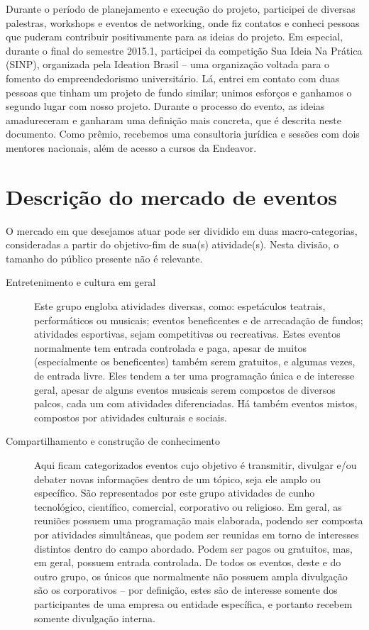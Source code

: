 \documentclass[12pt,a4paper,twoside,hyphens,english,brazil]{abntex2}
\begin{document}
Durante o período de planejamento e execução do projeto, participei de diversas palestras, workshops\cite{workshop-startup} e eventos de networking, onde fiz contatos e conheci pessoas que puderam contribuir positivamente para as ideias do projeto. Em especial, durante o final do semestre 2015.1, participei da competição Sua Ideia Na Prática (SINP), organizada pela Ideation Brasil\cite{sinp-2015.1} -- uma organização voltada para o fomento do empreendedorismo universitário. Lá, entrei em contato com duas pessoas que tinham um projeto de fundo similar; unimos esforços e ganhamos o segundo lugar com nosso projeto. Durante o processo do evento, as ideias amadureceram e ganharam uma definição mais concreta, que é descrita neste documento. Como prêmio, recebemos uma consultoria jurídica e sessões com dois mentores nacionais, além de acesso a cursos da Endeavor.


\section{Descrição do mercado de eventos}
O mercado em que desejamos atuar pode ser dividido em duas macro-categorias, consideradas a partir do objetivo-fim de sua(s) atividade(s). Nesta divisão, o tamanho do público presente não é relevante. %

\begin{description}
	\item[Entretenimento e cultura em geral]
	Este grupo engloba atividades diversas, como: espetáculos teatrais, performáticos ou musicais; eventos beneficentes e de arrecadação de fundos; atividades esportivas, sejam competitivas ou recreativas. Estes eventos normalmente tem entrada controlada e paga, apesar de muitos (especialmente os beneficentes) também serem gratuitos, e algumas vezes, de entrada livre. Eles tendem a ter uma programação única e de interesse geral, apesar de alguns eventos musicais serem compostos de diversos palcos, cada um com atividades diferenciadas. Há também eventos mistos, compostos por atividades culturais e sociais.

	\item[Compartilhamento e construção de conhecimento]
	Aqui ficam categorizados eventos cujo objetivo é transmitir, divulgar e/ou debater novas informações dentro de um tópico, seja ele amplo ou específico. São representados por este grupo atividades de cunho tecnológico, científico, comercial, corporativo ou religioso. Em geral, as reuniões possuem uma programação mais elaborada, podendo ser composta por atividades simultâneas, que podem ser reunidas em torno de interesses distintos dentro do campo abordado. Podem ser pagos ou gratuitos, mas, em geral, possuem entrada controlada. De todos os eventos, deste e do outro grupo, os únicos que normalmente não possuem ampla divulgação são os corporativos -- por definição, estes são de interesse somente dos participantes de uma empresa ou entidade específica, e portanto recebem somente divulgação interna.
\end{description}
\end{document}
